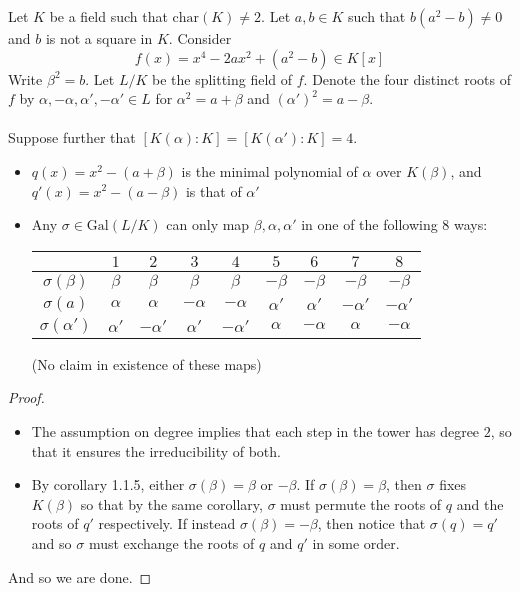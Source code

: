 \documentclass[a4paper]{article}
\begin{document}
\begin{lmm}{}{} Let $K$ be a field such that $\text{char}(K)\neq 2$. Let $a,b\in K$ such that $b(a^2-b)\neq 0$ and $b$ is not a square in $K$. Consider $$f(x)=x^4-2ax^2+(a^2-b)\in K[x]$$ Write $\beta^2=b$. Let $L/K$ be the splitting field of $f$. Denote the four distinct roots of $f$ by $\alpha,-\alpha,\alpha',-\alpha'\in L$ for $\alpha^2=a+\beta$ and $(\alpha')^2=a-\beta$. \\~\\

Suppose further that $[K(\alpha):K]=[K(\alpha'):K]=4$. 
\begin{itemize}
\item $q(x)=x^2-(a+\beta)$ is the minimal polynomial of $\alpha$ over $K(\beta)$, and $q'(x)=x^2-(a-\beta)$ is that of $\alpha'$
\item Any $\sigma\in\text{Gal}(L/K)$ can only map $\beta,\alpha,\alpha'$ in one of the following $8$ ways: 
\begin{center}
\begin{tabular}{ c|cccccccc } 
& $1$ & $2$ & $3$ & $4$ & $5$ & $6$ & $7$ & $8$\\\hline
$\sigma(\beta)$ & $\beta$ & $\beta$ & $\beta$ & $\beta$ & $-\beta$ & $-\beta$ & $-\beta$ & $-\beta$ \\
$\sigma(a)$ & $\alpha$ & $\alpha$ & $-\alpha$ & $-\alpha$ & $\alpha'$ & $\alpha'$ & $-\alpha'$ & $-\alpha'$\\
$\sigma(\alpha')$ & $\alpha'$ & $-\alpha'$ & $\alpha'$ & $-\alpha'$ & $\alpha$ & $-\alpha$ & $\alpha$ & $-\alpha$
\end{tabular}
\end{center}
(No claim in existence of these maps)
\end{itemize} \tcbline
\begin{proof}~\\
\begin{itemize}
\item The assumption on degree implies that each step in the tower has degree $2$, so that it ensures the irreducibility of both. 
\item By corollary 1.1.5, either $\sigma(\beta)=\beta$ or $-\beta$. If $\sigma(\beta)=\beta$, then $\sigma$ fixes $K(\beta)$ so that by the same corollary, $\sigma$ must permute the roots of $q$ and the roots of $q'$ respectively. If instead $\sigma(\beta)=-\beta$, then notice that $\sigma(q)=q'$ and so $\sigma$ must exchange the roots of $q$ and $q'$ in some order. 
\end{itemize}
And so we are done. 
\end{proof}
\end{lmm}
\end{document}
